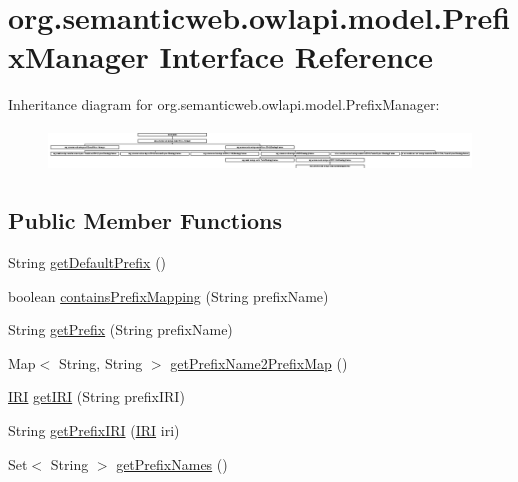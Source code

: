 \hypertarget{interfaceorg_1_1semanticweb_1_1owlapi_1_1model_1_1_prefix_manager}{\section{org.\-semanticweb.\-owlapi.\-model.\-Prefix\-Manager Interface Reference}
\label{interfaceorg_1_1semanticweb_1_1owlapi_1_1model_1_1_prefix_manager}
}
Inheritance diagram for org.\-semanticweb.\-owlapi.\-model.\-Prefix\-Manager\-:\begin{figure}[H]
\begin{center}
\leavevmode
\includegraphics[height=1.147541cm]{interfaceorg_1_1semanticweb_1_1owlapi_1_1model_1_1_prefix_manager}
\end{center}
\end{figure}
\subsection*{Public Member Functions}
\begin{DoxyCompactItemize}
\item 
String \hyperlink{interfaceorg_1_1semanticweb_1_1owlapi_1_1model_1_1_prefix_manager_a264fffed56e72c2f66e6152344a46ab5}{get\-Default\-Prefix} ()
\item 
boolean \hyperlink{interfaceorg_1_1semanticweb_1_1owlapi_1_1model_1_1_prefix_manager_acb5b1eaea065f40c987e2a29193405e0}{contains\-Prefix\-Mapping} (String prefix\-Name)
\item 
String \hyperlink{interfaceorg_1_1semanticweb_1_1owlapi_1_1model_1_1_prefix_manager_a64b493a467d37f80713d5001b250cbe4}{get\-Prefix} (String prefix\-Name)
\item 
Map$<$ String, String $>$ \hyperlink{interfaceorg_1_1semanticweb_1_1owlapi_1_1model_1_1_prefix_manager_a4342e3cbafdbc3ae0c9414074b559b7f}{get\-Prefix\-Name2\-Prefix\-Map} ()
\item 
\hyperlink{classorg_1_1semanticweb_1_1owlapi_1_1model_1_1_i_r_i}{I\-R\-I} \hyperlink{interfaceorg_1_1semanticweb_1_1owlapi_1_1model_1_1_prefix_manager_a5053d46921287d35b45292cfd10bafb5}{get\-I\-R\-I} (String prefix\-I\-R\-I)
\item 
String \hyperlink{interfaceorg_1_1semanticweb_1_1owlapi_1_1model_1_1_prefix_manager_adc16dc581492bf125a80f487afd9e0df}{get\-Prefix\-I\-R\-I} (\hyperlink{classorg_1_1semanticweb_1_1owlapi_1_1model_1_1_i_r_i}{I\-R\-I} iri)
\item 
Set$<$ String $>$ \hyperlink{interfaceorg_1_1semanticweb_1_1owlapi_1_1model_1_1_prefix_manager_ab3a4bc8785588f1bb53e4dd157d3440f}{get\-Prefix\-Names} ()
\end{DoxyCompactItemize}


